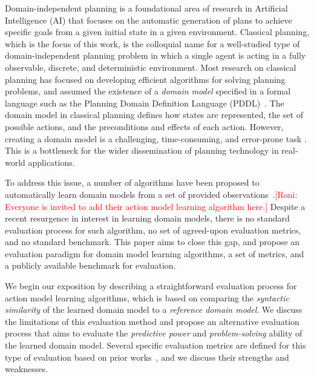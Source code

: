 \documentclass{article}
\theoremstyle{definition}
\theoremstyle{remark}
\newcommand{\roni}[1]{{\textcolor{red}{[Roni: #1]}}}
\begin{document}
Domain-independent planning is a foundational area of research in Artificial Intelligence (AI) that focuses on the automatic generation of plans to achieve specific goals from a given initial state in a given environment. Classical planning, which is the focus of this work, is the colloquial name for a well-studied type of domain-independent planning problem in which a single agent is acting in a fully observable, discrete, and deterministic environment. 
Most research on classical planning has focused on developing efficient algorithms for solving planning problems, and assumed the existence of a \emph{domain model} specified in a formal language such as the Planning Domain Definition Language (PDDL)~\citep{haslum2019introduction}. 
The domain model in classical planning defines how states are represented, the set of possible actions, and the preconditions and effects of each action. 
However, creating a domain model is a challenging, time-consuming, and error-prone task \citep{DBLP:conf/kcap/McCluskeyVV17}.
This is a bottleneck for the wider dissemination of planning technology in real-world applications. 

To address this issue, a number of algorithms have been proposed to automatically learn domain models from a set of provided observations~\citep{gösgens2025learningfromonlyactiontraces,LAMANNA2025104256,xi2024neuro,mordoch2024safe,juba2021safe,lamanna2021online,cresswell2011generalised,ZHUO20101540}.\roni{Everyone is invited to add their action model learning algorithm here.}
Despite a recent resurgence in interest in learning domain models, there is no standard evaluation process for such algorithm, 
no set of agreed-upon evaluation metrics, and no standard benchmark. 
This paper aims to close this gap, and propose an evaluation paradigm for domain model learning algorithms, a set of metrics, and a publicly available benchmark for evaluation. 


We begin our exposition by describing a straightforward evaluation process for action model learning algorithms, which is based on comparing the \emph{syntactic similarity} of the learned domain model to a \emph{reference domain model}. We discuss the limitations of this evaluation method and propose an alternative evaluation process that aims to evaluate the \emph{predictive power} and \emph{problem-solving} ability of the learned domain model. 
Several specific evaluation metrics are defined for this type of evaluation based on prior works~\citep{aineto2019learning,juba2021safe,mordoch2024safe,Oswald2024DLLMDomainModeling}, and we discuss their strengths and weaknesses. 
\end{document}
